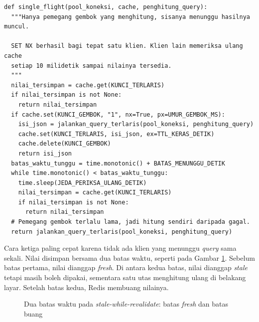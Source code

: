 \begin{lstlisting}[style=PythonStyle, caption={Hanya satu klien yang menghitung, tersedia di \berkas{sources/chapter04/stampede.py}}, label={lst:single-flight}]
def single_flight(pool_koneksi, cache, penghitung_query):
  """Hanya pemegang gembok yang menghitung, sisanya menunggu hasilnya muncul.

  SET NX berhasil bagi tepat satu klien. Klien lain memeriksa ulang cache
  setiap 10 milidetik sampai nilainya tersedia.
  """
  nilai_tersimpan = cache.get(KUNCI_TERLARIS)
  if nilai_tersimpan is not None:
    return nilai_tersimpan
  if cache.set(KUNCI_GEMBOK, "1", nx=True, px=UMUR_GEMBOK_MS):
    isi_json = jalankan_query_terlaris(pool_koneksi, penghitung_query)
    cache.set(KUNCI_TERLARIS, isi_json, ex=TTL_KERAS_DETIK)
    cache.delete(KUNCI_GEMBOK)
    return isi_json
  batas_waktu_tunggu = time.monotonic() + BATAS_MENUNGGU_DETIK
  while time.monotonic() < batas_waktu_tunggu:
    time.sleep(JEDA_PERIKSA_ULANG_DETIK)
    nilai_tersimpan = cache.get(KUNCI_TERLARIS)
    if nilai_tersimpan is not None:
      return nilai_tersimpan
  # Pemegang gembok terlalu lama, jadi hitung sendiri daripada gagal.
  return jalankan_query_terlaris(pool_koneksi, penghitung_query)
\end{lstlisting}

Cara ketiga paling cepat karena tidak ada klien yang menunggu \textit{query} sama
sekali. Nilai disimpan bersama dua batas waktu, seperti pada Gambar
\ref{fig:ttl-lunak-keras}. Sebelum batas pertama, nilai dianggap \textit{fresh}. Di
antara kedua batas, nilai dianggap \textit{stale} tetapi masih boleh dipakai, sementara
satu utas menghitung ulang di belakang layar. Setelah batas kedua, Redis
membuang nilainya.

\begin{figure}[!htb]
  \centering
  \caption{Dua batas waktu pada \textit{stale-while-revalidate}: batas \textit{fresh}
           dan batas buang}
  \label{fig:ttl-lunak-keras}
\end{figure}

